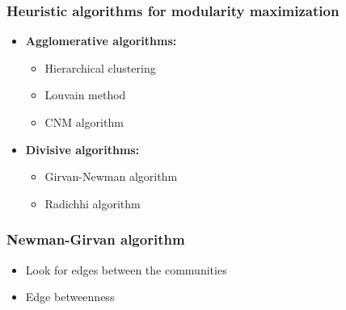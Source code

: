 \documentclass{beamer}
\begin{document}
\begin{frame}
    \frametitle{Heuristic algorithms for modularity maximization}
    \centering
    \begin{itemize}
        \setlength\itemsep{2em}
        \item{{\bf Agglomerative algorithms:}
            
    \begin{itemize}
        \setlength\itemsep{1em}
        \item{Hierarchical clustering}
        \item{Louvain method}
        \item{CNM algorithm}
    \end{itemize}
            
            }
        \item{{\bf Divisive algorithms:}
            
    \begin{itemize}
        \setlength\itemsep{1em}
        \item{Girvan-Newman algorithm}
        \item{Radichhi algorithm}
    \end{itemize}
            
            
            }
    \end{itemize}
\end{frame}
\begin{frame}
    \frametitle{Newman-Girvan algorithm}
    \centering
    
    \begin{itemize}
        \setlength\itemsep{1em}
        \item{Look for edges between the communities}

        \item{Edge betweenness}
    \end{itemize}
\end{frame}
%
\end{document}
